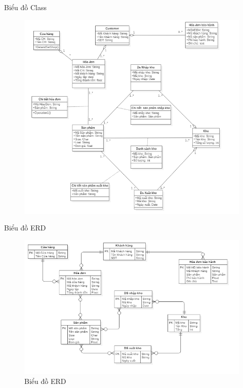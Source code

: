 \documentclass{beamer}
\begin{document}
\begin{frame}{Biểu đồ Class}
    \begin{figure}
        \centering
        \includegraphics[scale = 0.5]{7.png}

    \end{figure}
\end{frame}


\begin{frame}{Biểu đồ ERD}
\begin{figure}
    \centering
    \includegraphics[scale = 0.5]{16.png}
    \caption{Biểu đồ ERD}
\end{figure}


\end{frame}
\end{document}
